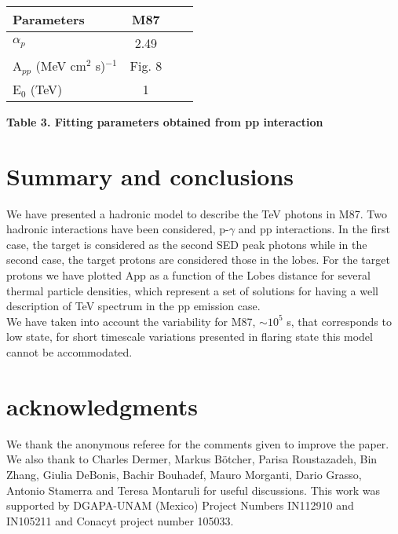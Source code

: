 \documentclass[preprint, twocolumn,secnumarabic,amssymb, nobibnotes, aps, prd]{revtex4-1}
\begin{document}
\begin{center}\renewcommand{\arraystretch}{0.75}\addtolength{\tabcolsep}{-1pt}
\begin{tabular}{ l c c c }


\hline
\hline
\normalsize{Parameters} &  \normalsize{M87} &  \\
\hline
\hline

\scriptsize{$\alpha_p$}  & \scriptsize{2.49}  \\
\scriptsize{A$_{pp}$  (MeV cm$^2$ s)$^{-1}$ }     & \scriptsize{Fig. 8 }     \\
\scriptsize{E$_0$ (TeV)}    &\scriptsize{1}    \\

\hline
\hline

 \end{tabular}
\end{center}

\begin{center}
\scriptsize{\textbf{Table 3. Fitting parameters obtained from  pp interaction}}\\
\scriptsize{}
\end{center}



\section{Summary and conclusions}

We have presented a hadronic model to describe the TeV photons in M87. Two hadronic interactions have been considered, p-$\gamma$ and pp interactions. In the first case, the target is considered as the second SED peak photons while in the second case, the target protons are considered those in the lobes.  For the target protons we have plotted App as a function of the Lobes distance for several thermal particle densities,   which represent a set of solutions for having a well description of TeV spectrum in the pp emission case.\\
 We have taken into account the variability for M87, $\sim  10^{5}$ s, that corresponds to low state, for short  timescale variations presented in flaring state  this model  cannot be accommodated.

 
\section{acknowledgments}
We thank the anonymous referee for the comments given to improve the paper. We also thank to Charles Dermer, Markus B\"{o}tcher,  Parisa Roustazadeh,    Bin Zhang, Giulia DeBonis, Bachir Bouhadef, Mauro Morganti, Dario Grasso, Antonio Stamerra and Teresa Montaruli for useful discussions. 
This work was supported by DGAPA-UNAM (Mexico) Project Numbers IN112910 and IN105211 and Conacyt project number 105033.
\end{document}
